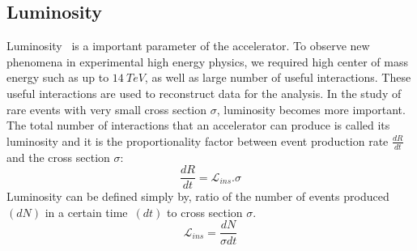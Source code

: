 \subsection{Luminosity}
Luminosity~\cite{Aberle:2749422} is a important parameter of the accelerator. To observe new phenomena in experimental high energy physics, we required high center of mass energy such as up to $14~TeV$, as well as large number of useful interactions. These useful interactions are used to reconstruct data for the analysis. In the study of rare events with very small cross section $\sigma$, luminosity becomes more important. The total number of interactions that an accelerator can produce is called its luminosity and it is the proportionality factor between event production rate $\frac{dR}{dt}$ and the cross section $\sigma$:
\begin{equation}\label{ins-lumi}
\frac{dR}{dt}=\mathcal{L}_{ins}.\sigma
\end{equation}
Luminosity can be defined simply by, ratio of the number of events produced~$(dN)$ in a certain time~$(dt)$ to cross section $\sigma$. 
\begin{equation}\label{ins-lumi}
\mathcal{L}_{ins}=\frac{dN}{\sigma dt}
\end{equation}
 
